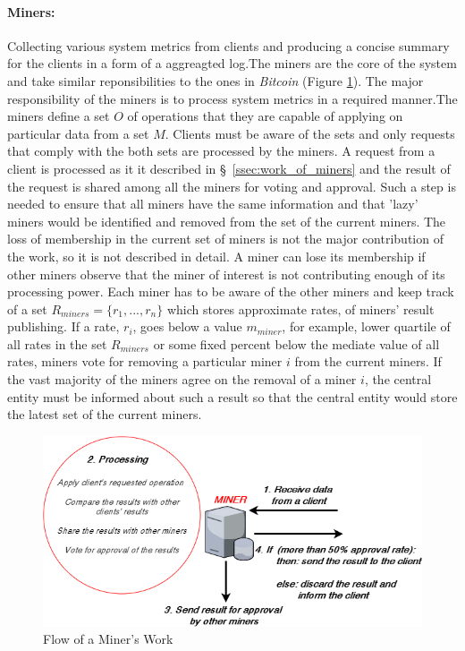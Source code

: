 \documentclass{article}
\begin{document}
\paragraph{Miners:} Collecting various system metrics from clients and producing a concise summary for the clients in a form of a aggreagted log.The miners are the core of the system and take similar reponsibilities to the ones in \textit{Bitcoin} (Figure \ref{fig:miner_work_flow}). The major responsibility of the miners is to process system metrics in a required manner.The miners define a set $O$ of operations that they are capable of applying on particular data from a set $M$. Clients must be aware of the sets and only requests that comply with the both sets are processed by the miners. A request from a client is processed as it it described in \S\ \ref{ssec:work_of_miners} and the result of the request is shared among all the miners for voting and approval. Such a step is needed to ensure that all miners have the same information and that 'lazy' miners would be identified and removed from the set of the current miners. The loss of membership in the current set of miners is not the major contribution of the work, so it is not described in detail. A miner can lose its membership if other miners observe that the miner of interest is not contributing enough of its processing power. Each miner has to be aware of the other miners and keep track of a set $R_{miners} = \{r_1, ..., r_n\}$ which stores approximate rates, of  miners' result publishing. If a rate, $r_i$, goes below a value $m_{miner}$,  for example, lower quartile of all rates in the set $R_{miners}$ or some fixed percent below the mediate value of all rates, miners vote for removing a particular miner $i$ from the current miners. If the vast majority of the miners agree on the removal of a miner $i$,  the central entity must be informed about such a result so that the central entity would store the latest set of the current miners.    
\par


\begin{figure}[h]
  \begin{center}
    \includegraphics[width=0.6\linewidth]{figures/miner_work_diagram.png}
    \caption{Flow of a Miner's Work}
    \label{fig:miner_work_flow}
  \end{center}
\end{figure}
\end{document}
